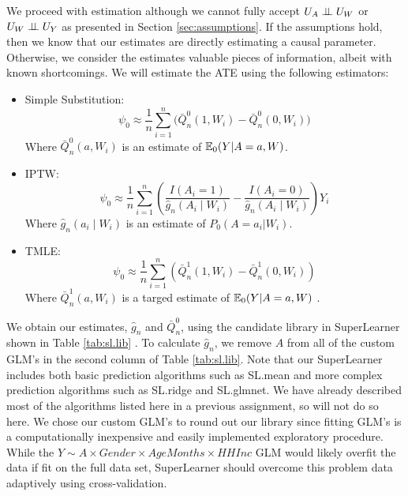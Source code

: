 \documentclass{article}
\begin{document}
We proceed with estimation although we cannot fully accept $U_A \perp\hspace{-5pt}\perp U_W$ or $U_W \perp\hspace{-5pt}\perp U_Y$ as presented in Section \ref{sec:assumptions}. If the assumptions hold, then we know that our estimates are directly estimating a causal parameter. Otherwise, we consider the estimates valuable pieces of information, albeit with known shortcomings. We will estimate the ATE using the following estimators: 

\begin{itemize}
  \item Simple Substitution:
    \[
      \psi_0 \approx \frac{1}{n}\sum_{i=1}^{n}\Big(\bar{Q}_{n}^{0}(1,W_i) - \bar{Q}_{n}^{0}(0,W_i)\Big)
    \]
Where $\bar{Q}_{n}^{0}(a,W_i)$ is an estimate of $\mathbb{E}_0(Y|A=a,W)$.
  \item IPTW:
  \[
    \psi_{0} \approx \frac{1}{n}\sum_{i=1}^{n} \left(\frac{I(A_i=1)}{\hat{g}_n(A_i \mid W_i)} - \frac{I(A_i=0)}{\hat{g}_n(A_i \mid W_i)} \right)Y_i
  \]
Where $\hat{g}_n(a_i \mid W_i)$ is an estimate of $P_0(A=a_i|W_i)$.
  \item TMLE:
  \[
    \psi_{0} \approx \frac{1}{n}\sum_{i=1}^{n}\left( \bar{Q}_{n}^{1}(1,W_i) - \bar{Q}_{n}^{1}(0,W_i)\right)
  \]
Where $\bar{Q}_{n}^{1}(a,W_i)$ is a targed estimate of $\mathbb{E}_0(Y|A=a,W)$ \cite{tmle}.
\end{itemize}

We obtain our estimates, $\hat{g}_{n}$ and $\bar{Q}_{n}^0$, using the candidate library in SuperLearner shown in Table \ref{tab:sl.lib} \cite{superlearner}. To calculate $\hat{g}_{n}$, we remove $A$ from all of the custom GLM's in the second column of Table \ref{tab:sl.lib}. Note that our SuperLearner includes both basic prediction algorithms such as SL.mean and more complex prediction algorithms such as SL.ridge and SL.glmnet. We have already described most of the algorithms listed here in a previous assignment, so will not do so here. We chose our custom GLM's to round out our library since fitting GLM's is a computationally inexpensive and easily implemented exploratory procedure. While the $Y \sim A \times Gender \times AgeMonths \times HHInc$ GLM would likely overfit the data if fit on the full data set, SuperLearner should overcome this problem data adaptively using cross-validation.
\end{document}
